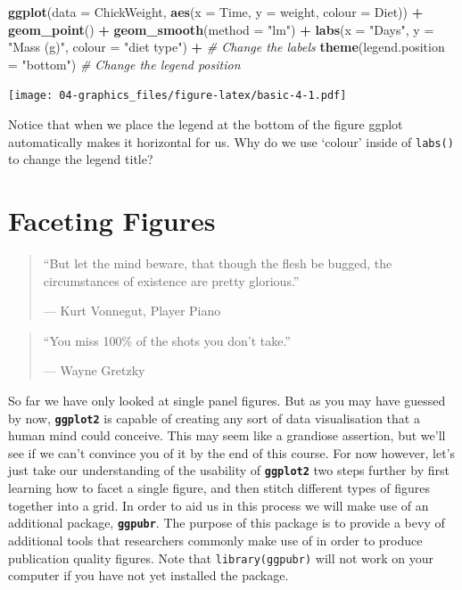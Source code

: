 \documentclass[]{book}
\newenvironment{Shaded}{\begin{snugshade}}{\end{snugshade}}
\newcommand{\KeywordTok}[1]{\textcolor[rgb]{0.13,0.29,0.53}{\textbf{#1}}}
\newcommand{\DataTypeTok}[1]{\textcolor[rgb]{0.13,0.29,0.53}{#1}}
\newcommand{\StringTok}[1]{\textcolor[rgb]{0.31,0.60,0.02}{#1}}
\newcommand{\CommentTok}[1]{\textcolor[rgb]{0.56,0.35,0.01}{\textit{#1}}}
\newcommand{\OperatorTok}[1]{\textcolor[rgb]{0.81,0.36,0.00}{\textbf{#1}}}
\newcommand{\NormalTok}[1]{#1}
\theoremstyle{definition}
\theoremstyle{definition}
\theoremstyle{definition}
\theoremstyle{remark}
\begin{document}
\begin{Shaded}
\begin{Highlighting}[]
\KeywordTok{ggplot}\NormalTok{(}\DataTypeTok{data =}\NormalTok{ ChickWeight, }\KeywordTok{aes}\NormalTok{(}\DataTypeTok{x =}\NormalTok{ Time, }\DataTypeTok{y =}\NormalTok{ weight, }\DataTypeTok{colour =}\NormalTok{ Diet)) }\OperatorTok{+}
\StringTok{  }\KeywordTok{geom_point}\NormalTok{() }\OperatorTok{+}
\StringTok{  }\KeywordTok{geom_smooth}\NormalTok{(}\DataTypeTok{method =} \StringTok{"lm"}\NormalTok{) }\OperatorTok{+}
\StringTok{  }\KeywordTok{labs}\NormalTok{(}\DataTypeTok{x =} \StringTok{"Days"}\NormalTok{, }\DataTypeTok{y =} \StringTok{"Mass (g)"}\NormalTok{, }\DataTypeTok{colour =} \StringTok{"diet type"}\NormalTok{) }\OperatorTok{+}\StringTok{ }\CommentTok{# Change the labels}
\StringTok{  }\KeywordTok{theme}\NormalTok{(}\DataTypeTok{legend.position =} \StringTok{"bottom"}\NormalTok{) }\CommentTok{# Change the legend position}
\end{Highlighting}
\end{Shaded}

\texttt{[image: 04-graphics\_files/figure-latex/basic-4-1.pdf]}

Notice that when we place the legend at the bottom of the figure ggplot
automatically makes it horizontal for us. Why do we use `colour' inside
of \texttt{labs()} to change the legend title?

\chapter{Faceting Figures}\label{faceting}

\begin{quote}
``But let the mind beware, that though the flesh be bugged, the
circumstances of existence are pretty glorious.''

--- Kurt Vonnegut, Player Piano
\end{quote}

\begin{quote}
``You miss 100\% of the shots you don't take.''

--- Wayne Gretzky
\end{quote}

So far we have only looked at single panel figures. But as you may have
guessed by now, \textbf{\texttt{ggplot2}} is capable of creating any
sort of data visualisation that a human mind could conceive. This may
seem like a grandiose assertion, but we'll see if we can't convince you
of it by the end of this course. For now however, let's just take our
understanding of the usability of \textbf{\texttt{ggplot2}} two steps
further by first learning how to facet a single figure, and then stitch
different types of figures together into a grid. In order to aid us in
this process we will make use of an additional package,
\textbf{\texttt{ggpubr}}. The purpose of this package is to provide a
bevy of additional tools that researchers commonly make use of in order
to produce publication quality figures. Note that
\texttt{library(ggpubr)} will not work on your computer if you have not
yet installed the package.
\end{document}
